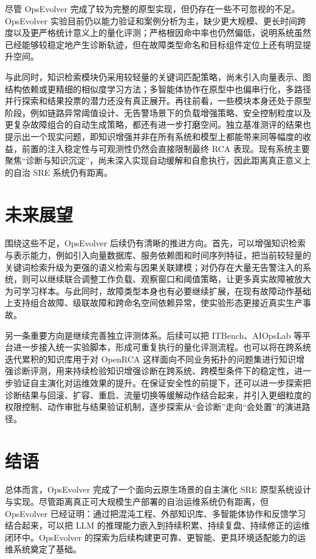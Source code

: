 尽管 OpsEvolver 完成了较为完整的原型实现，但仍存在一些不可忽视的不足。OpsEvolver 实验目前仍以能力验证和案例分析为主，缺少更大规模、更长时间跨度以及更严格统计意义上的量化评测；严格根因命中率也仍然偏低，说明系统虽然已经能够较稳定地产生诊断轨迹，但在故障类型命名和目标组件定位上还有明显提升空间。

与此同时，知识检索模块仍采用较轻量的关键词匹配策略，尚未引入向量表示、图结构依赖或更精细的相似度学习方法；多智能体协作在原型中也偏串行化，多路径并行探索和结果投票的潜力还没有真正展开。再往前看，一些模块本身还处于原型阶段，例如链路异常阈值设计、无告警场景下的负载增强策略、安全控制粒度以及更复杂故障组合的自动生成策略，都还有进一步打磨空间。独立基准测评的结果也提示出一个现实问题，即知识增强并非在所有系统和模型上都能带来同等幅度的收益，前置的注入稳定性与可观测性仍然会直接限制最终 RCA 表现。现有系统主要聚焦“诊断与知识沉淀”，尚未深入实现自动缓解和自愈执行，因此距离真正意义上的自治 SRE 系统仍有距离。

\section{未来展望}
\label{sec:future_work}

围绕这些不足，OpsEvolver 后续仍有清晰的推进方向。首先，可以增强知识检索与表示能力，例如引入向量数据库、服务依赖图和时间序列特征，把当前较轻量的关键词检索升级为更强的语义检索与因果关联建模；对仍存在大量无告警注入的系统，则可以继续联合调整工作负载、观察窗口和阈值策略，让更多真实故障被放大为可学习样本。与此同时，故障类型本身也有必要继续扩展，在现有故障动作基础上支持组合故障、级联故障和跨命名空间依赖异常，使实验形态更接近真实生产事故。

另一条重要方向是继续完善独立评测体系。后续可以把 ITBench、AIOpsLab 等平台进一步接入统一实验脚本，形成可重复执行的量化评测流程。也可以将在跨系统迭代累积的知识库用于对 OpenRCA 这样面向不同业务拓扑的问题集进行知识增强诊断评测，用来持续检验知识增强诊断在跨系统、跨模型条件下的稳定性，进一步验证自主演化对运维效果的提升。在保证安全性的前提下，还可以进一步探索把诊断结果与回滚、扩容、重启、流量切换等缓解动作结合起来，并引入更细粒度的权限控制、动作审批与结果验证机制，逐步探索从“会诊断”走向“会处置”的演进路径。

\section{结语}
\label{sec:final_words}

总体而言，OpsEvolver 完成了一个面向云原生场景的自主演化 SRE 原型系统设计与实现。尽管距离真正可大规模生产部署的自治运维系统仍有距离，但OpsEvolver 已经证明：通过把混沌工程、外部知识库、多智能体协作和反馈学习结合起来，可以把 LLM 的推理能力嵌入到持续积累、持续复盘、持续修正的运维闭环中。OpsEvolver 的探索为后续构建更可靠、更智能、更具环境适配能力的运维系统奠定了基础。
